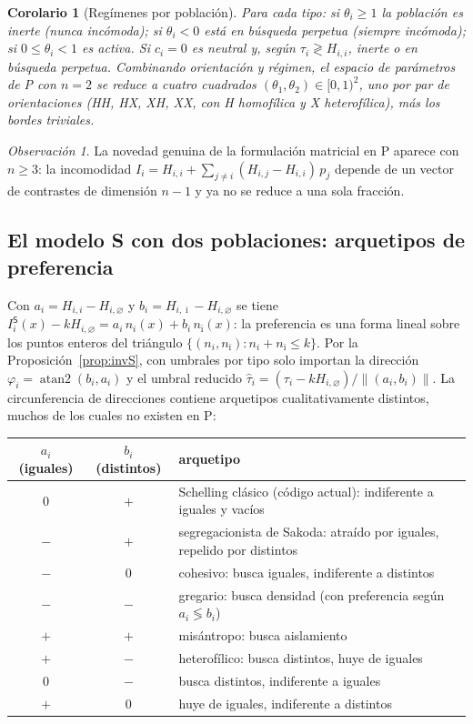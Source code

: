 \documentclass[11pt,a4paper]{article}
\theoremstyle{plain}
\newtheorem{corolario}{Corolario}
\theoremstyle{definition}
\theoremstyle{remark}
\newtheorem{observacion}{Observación}
\newcommand{\vac}{\varnothing}
\newcommand{\modP}{\textsf{P}}
\newcommand{\modS}{\textsf{S}}
\begin{document}
\begin{corolario}[Regímenes por población]
Para cada tipo: si $\theta_i\ge1$ la población es \emph{inerte} (nunca
incómoda); si $\theta_i<0$ está en \emph{búsqueda perpetua} (siempre incómoda);
si $0\le\theta_i<1$ es \emph{activa}. Si $c_i=0$ es neutral y, según
$\tau_i\gtrless H_{i,i}$, inerte o en búsqueda perpetua. Combinando
orientación y régimen, el espacio de parámetros de \modP{} con $n=2$ se reduce a
cuatro cuadrados $(\theta_1,\theta_2)\in[0,1)^2$, uno por par de orientaciones
(HH, HX, XH, XX, con H homofílica y X heterofílica), más los bordes triviales.
\end{corolario}

\begin{observacion}
La novedad genuina de la formulación matricial en \modP{} aparece con
$n\ge3$: la incomodidad
$I_i=H_{i,i}+\sum_{j\neq i}(H_{i,j}-H_{i,i})\,p_j$ depende de un vector de
contrastes de dimensión $n-1$ y ya no se reduce a una sola fracción.
\end{observacion}

\subsection{El modelo \modS{} con dos poblaciones: arquetipos de preferencia}

Con $a_i=H_{i,i}-H_{i,\vac}$ y $b_i=H_{i,\bar\imath}-H_{i,\vac}$ se tiene
$I^{\modS}_i(x)-kH_{i,\vac}=a_i\,n_i(x)+b_i\,n_{\bar\imath}(x)$: la preferencia
es una forma lineal sobre los puntos enteros del triángulo
$\{(n_i,n_{\bar\imath}):n_i+n_{\bar\imath}\le k\}$. Por la
Proposición~\ref{prop:invS}, con umbrales por tipo solo importan la dirección
$\varphi_i=\operatorname{atan2}(b_i,a_i)$ y el umbral reducido
$\hat\tau_i=(\tau_i-kH_{i,\vac})/\|(a_i,b_i)\|$. La circunferencia de
direcciones contiene arquetipos cualitativamente distintos, muchos de los cuales
no existen en \modP:

\begin{center}
\small
\begin{tabular}{@{}ccl@{}}
\toprule
$a_i$ (iguales) & $b_i$ (distintos) & arquetipo \\
\midrule
$0$ & $+$ & Schelling clásico (código actual): indiferente a iguales y vacíos \\
$-$ & $+$ & segregacionista de Sakoda: atraído por iguales, repelido por distintos \\
$-$ & $0$ & cohesivo: busca iguales, indiferente a distintos \\
$-$ & $-$ & gregario: busca densidad (con preferencia según $a_i\lessgtr b_i$) \\
$+$ & $+$ & misántropo: busca aislamiento \\
$+$ & $-$ & heterofílico: busca distintos, huye de iguales \\
$0$ & $-$ & busca distintos, indiferente a iguales \\
$+$ & $0$ & huye de iguales, indiferente a distintos \\
\bottomrule
\end{tabular}
\end{center}
\end{document}
